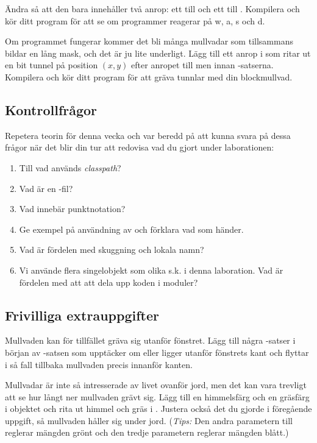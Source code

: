 \Subtask
Ändra  så att den bara innehåller två anrop: ett till  och ett till .
Kompilera och kör ditt program för att se om programmer reagerar på w, a, s och d.

\Subtask
Om programmet fungerar kommer det bli många mullvadar som tillsammans bildar en lång mask, och det är ju lite underligt.
Lägg till ett anrop i  som ritar ut en bit tunnel på position $(x, y)$ efter anropet till  men innan -satserna.
Kompilera och kör ditt program för att gräva tunnlar med din blockmullvad.

\subsection{Kontrollfrågor}\Checkpoint

\noindent Repetera teorin för denna vecka och var beredd på att kunna svara på dessa frågor när det blir din tur att redovisa vad du gjort under laborationen:

\begin{enumerate}
\item Till vad används \emph{classpath}?
\item Vad är en -fil?
\item Vad innebär punktnotation?
\item Ge exempel på användning av  och förklara vad som händer.
\item Vad är fördelen med skuggning och lokala namn? 
\item Vi använde flera singelobjekt som olika s.k.  i denna laboration. Vad är fördelen med att att dela upp koden i moduler?
\end{enumerate}

\subsection{Frivilliga extrauppgifter}

\Task
Mullvaden kan för tillfället gräva sig utanför fönstret.
Lägg till några -satser i början av -satsen som upptäcker om  eller  ligger utanför fönstrets kant och flyttar i så fall tillbaka mullvaden precis innanför kanten.

\Task
Mullvadar är inte så intresserade av livet ovanför jord, men det kan vara trevligt att se hur långt ner mullvaden grävt sig.
Lägg till en himmelsfärg och en gräsfärg i objektet  och rita ut himmel och gräs i .
Justera också det du gjorde i föregående uppgift, så mullvaden håller sig under jord.
(\emph{Tips:} Den andra parametern till  reglerar mängden grönt och den tredje parametern reglerar mängden blått.)

